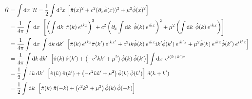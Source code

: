 \documentclass[12pt]{extarticle}
\begin{document}
\begin{align*}
\hat{H} & =  \int \mathrm{d}x \:  \: \mathcal{H} =  \frac{1}{2} \int \mathrm{d}^4 x\: \left[ \hat{\pi}(x)^2 + c^2 (\partial_x \hat{\phi}(x))^2 + \mu^2 \hat{\phi}(x)^2 \right] \\
& = \frac{1}{4 \pi}  \int \: \mathrm{d}x \:  \: \left[ \left( \int \mathrm{d}k \: \: \hat{\pi}(k) \: e^{i k x} \right)^2 + c^2 \left(\partial_x \int \mathrm{d}k \: \: \hat{\phi}(k) \: e^{i k x} \right)^2 + \mu^2 \left(\int \mathrm{d}k \: \: \hat{\phi}(k) \: e^{i k x}\right) \right] 
\\
& = \frac{1}{4 \pi} \int \: \mathrm{d}x \: \int \mathrm{d}k \: \mathrm{d}k' \: \: \left[ \hat{\pi}(k) \: e^{i k x} \hat{\pi}(k') \: e^{i k x'} + c^2 i k \hat{\phi}(k) \: e^{i k x} i k' \hat{\phi}(k') \: e^{i k' x}  + \mu^2 \hat{\phi}(k) \: e^{i k x} \hat{\phi}(k') \: e^{i k' x} \right] 
\\
& = \frac{1}{4 \pi}  \int \mathrm{d}k \: \mathrm{d}k' \: \: \left[ \hat{\pi}(k) \: \hat{\pi}(k')  + \left( - c^2 k k'  + \mu^2 \right) \hat{\phi}(k) \: \hat{\phi}(k') \right] \int \mathrm{d}x \: \: e^{i (k + k') x} 
\\
& = \frac{1}{2}  \int \mathrm{d}k \: \mathrm{d}k' \: \: \left[ \hat{\pi}(k) \: \hat{\pi}(k')  + \left( - c^2 k k'  + \mu^2 \right) \hat{\phi}(k) \: \hat{\phi}(k') \right] \: \delta(k + k')
\\
& = \frac{1}{2}  \int \mathrm{d}k \: \: \left[ \hat{\pi}(k) \: \hat{\pi}(-k)  + \left(c^2 k^2  + \mu^2 \right) \hat{\phi}(k) \: \hat{\phi}(-k) \right] 
\end{align*}
\end{document}
